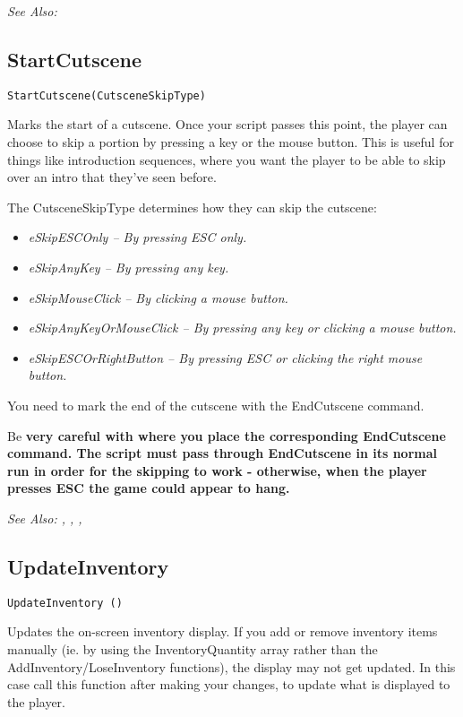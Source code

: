\it{See Also:} 



\subsection{StartCutscene}\label{StartCutscene}%

\begin{verbatim}
StartCutscene(CutsceneSkipType)
\end{verbatim}

Marks the start of a cutscene. Once your script passes this point, the player can
choose to skip a portion by pressing a key or the mouse button. This is useful for
things like introduction sequences, where you want the player to be able to skip
over an intro that they've seen before.

The CutsceneSkipType determines how they can skip the cutscene:
\begin{itemize}
\item \it{eSkipESCOnly} -- By pressing ESC only.
\item \it{eSkipAnyKey} -- By pressing any key.
\item \it{eSkipMouseClick} -- By clicking a mouse button.
\item \it{eSkipAnyKeyOrMouseClick} -- By pressing any key or clicking a mouse button.
\item \it{eSkipESCOrRightButton} -- By pressing ESC or clicking the right mouse button.
\end{itemize}
You need to mark the end of the cutscene with the EndCutscene command.

Be \bf{very careful} with where you place the corresponding EndCutscene command.
The script \bf{must} pass through EndCutscene in its normal run in order for the skipping
to work - otherwise, when the player presses ESC the game could appear to hang.

\it{See Also:} ,
,
,


\subsection{UpdateInventory}\label{UpdateInventory}%

\begin{verbatim}
UpdateInventory ()
\end{verbatim}
Updates the on-screen inventory display. If you add or remove inventory
items manually (ie. by using the InventoryQuantity array rather than
the AddInventory/LoseInventory functions), the display may not get updated.
In this case call this function after making your changes, to update
what is displayed to the player.

